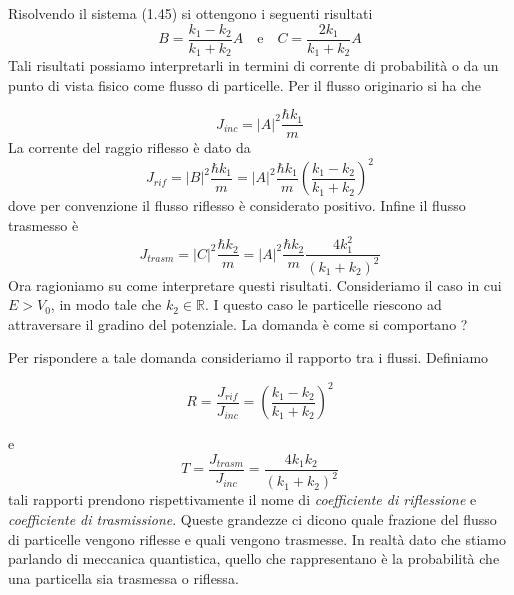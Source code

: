 \noindent Risolvendo il sistema (1.45) si ottengono i seguenti risultati
\begin{equation}
	B = \frac{k_1 - k_2}{k_1 + k_2}A \quad \text{e} \quad C = \frac{2k_1}{k_1 + k_2}A 
\end{equation}
Tali risultati possiamo interpretarli in termini di corrente di probabilit\`a o da un punto di vista fisico come flusso di particelle. Per il flusso originario si ha che 

\begin{equation*}
	J_{inc} = |A|^2\frac{\hbar k_1}{m}
\end{equation*}
La corrente del raggio riflesso \`e dato da
\begin{equation*}
	J_{rif} = |B|^2\frac{\hbar k_1}{m} = |A|^2\frac{\hbar k_1}{m} \left (\frac{k_1 - k_2}{k_1 + k_2}\right )^2 
\end{equation*}
dove per convenzione il flusso riflesso \`e considerato positivo. Infine il flusso trasmesso \`e 
\begin{equation*}
	J_{trasm} = |C|^2 \frac{\hbar k_2}{m} = |A|^2 \frac{\hbar k_2}{m}\frac{ 4k_1^2}{(k_1 + k_2)^2}
\end{equation*}
Ora ragioniamo su come interpretare questi risultati. Consideriamo il caso in cui $E > V_0$, in modo tale che $k_2 \in \mathbb{R}$. I questo caso le particelle riescono ad attraversare il gradino del potenziale. La domanda \`e come si comportano ? 
\newline

\noindent Per rispondere a tale domanda consideriamo il rapporto tra i flussi. Definiamo

\newpage

\begin{equation*}
	R = \frac{J_{rif}}{J_{inc}} = \left (\frac{k_1 - k_2}{k_1 + k_2} \right )^2
\end{equation*}

e
\begin{equation*}
	T = \frac{J_{trasm}}{J_{inc}} = \frac{4k_1k_2}{(k_1+k_2)^2}
\end{equation*}
tali rapporti prendono rispettivamente il nome di \textit{coefficiente di riflessione } e \textit{coefficiente di trasmissione}. Queste grandezze ci dicono quale frazione del flusso di particelle vengono riflesse e quali vengono trasmesse. In realt\`a dato che stiamo parlando di meccanica quantistica, quello che rappresentano \`e la probabilit\`a che una particella sia trasmessa o riflessa.
\newline


